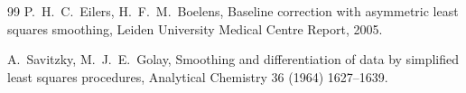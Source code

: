 \documentclass[11pt,a4paper]{article}
\begin{document}
\begin{thebibliography}{99}
P.~H.~C.~Eilers, H.~F.~M.~Boelens, Baseline correction with asymmetric least
squares smoothing, Leiden University Medical Centre Report, 2005.

A.~Savitzky, M.~J.~E.~Golay, Smoothing and differentiation of data by simplified
least squares procedures, Analytical Chemistry 36 (1964) 1627--1639.


\end{thebibliography}
\end{document}

